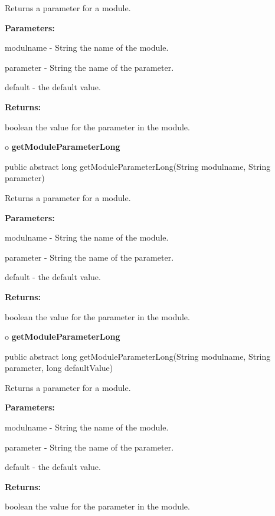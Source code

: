 \begin{description}
\htmlDD Returns a parameter for a module. 

\begin{description}
\item {\bf Parameters:}  

modulname - String the name of the module.  

parameter - String the name of the parameter.  

default - the default value.  
\item {\bf Returns:}  

boolean the value for the parameter in the module.  
\end{description}

\end{description}

o {\bf getModuleParameterLong} 

\begin{PRE}
 public abstract long getModuleParameterLong(String modulname,
                                             String parameter)
\end{PRE}

\begin{description}
\htmlDD Returns a parameter for a module. 

\begin{description}
\item {\bf Parameters:}  

modulname - String the name of the module.  

parameter - String the name of the parameter.  

default - the default value.  
\item {\bf Returns:}  

boolean the value for the parameter in the module.  
\end{description}

\end{description}

o {\bf getModuleParameterLong} 

\begin{PRE}
 public abstract long getModuleParameterLong(String modulname,
                                             String parameter,
                                             long defaultValue)
\end{PRE}

\begin{description}
\htmlDD Returns a parameter for a module. 

\begin{description}
\item {\bf Parameters:}  

modulname - String the name of the module.  

parameter - String the name of the parameter.  

default - the default value.  
\item {\bf Returns:}  

boolean the value for the parameter in the module.  
\end{description}

\end{description}

